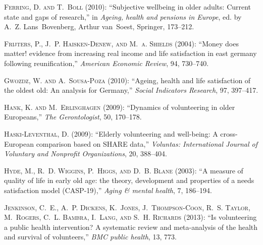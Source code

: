 \documentclass[10pt, letterpaper]{article}
\begin{document}
\begin{spacing}{1.4}
\begin{spacing}{.9}
\begin{thebibliography}{71}
\textsc{Ferring, D. and T.~Boll} (2010): \enquote{Subjective wellbeing in older
  adults: Current state and gaps of research,} in \emph{Ageing, health and
  pensions in Europe}, ed. by A.~Z. Lans~Bovenberg, Arthur van~Soest, Springer,
  173--212.

\textsc{Frijters, P., J.~P. Haisken-Denew, and M.~a. Shields} (2004):
  \enquote{{Money does matter! evidence from increasing real income and life
  satisfaction in east germany following reunification},} \emph{American
  Economic Review}, 94, 730--740.

\textsc{Gwozdz, W. and A.~Sousa-Poza} (2010): \enquote{Ageing, health and life
  satisfaction of the oldest old: An analysis for Germany,} \emph{Social
  Indicators Research}, 97, 397--417.

\textsc{Hank, K. and M.~Erlinghagen} (2009): \enquote{Dynamics of volunteering
  in older Europeans,} \emph{The Gerontologist}, 50, 170--178.

\textsc{Haski-Leventhal, D.} (2009): \enquote{Elderly volunteering and
  well-being: A cross-European comparison based on SHARE data,} \emph{Voluntas:
  International Journal of Voluntary and Nonprofit Organizations}, 20,
  388--404.

\textsc{Hyde, M., R.~D. Wiggins, P.~Higgs, and D.~B. Blane} (2003): \enquote{A
  measure of quality of life in early old age: the theory, development and
  properties of a needs satisfaction model (CASP-19),} \emph{Aging \& mental
  health}, 7, 186--194.

\textsc{Jenkinson, C.~E., A.~P. Dickens, K.~Jones, J.~Thompson-Coon, R.~S.
  Taylor, M.~Rogers, C.~L. Bambra, I.~Lang, and S.~H. Richards} (2013):
  \enquote{Is volunteering a public health intervention? A systematic review
  and meta-analysis of the health and survival of volunteers,} \emph{BMC public
  health}, 13, 773.


\end{thebibliography}
\end{spacing}
\end{spacing}
\end{document}

